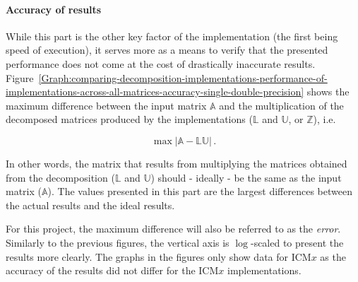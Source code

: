 \paragraph{Accuracy of results} While this part is the other key factor of the implementation (the first being speed of execution), it serves more as a means to verify that the presented performance does not come at the cost of drastically inaccurate results. Figure~\ref{Graph:comparing-decomposition-implementations-performance-of-implementations-across-all-matrices-accuracy-single-double-precision} shows the maximum difference between the input matrix $ \mathbb{A} $ and the multiplication of the decomposed matrices produced by the implementations ($ \mathbb{L} $ and $ \mathbb{U} $, or $ \mathbb{Z} $), i.e.

\begin{equation}
	\max\left| \mathbb{A} - \mathbb{L}\mathbb{U}\right| \nonumber \,.
\end{equation}

In other words, the matrix that results from multiplying the matrices obtained from the decomposition ($ \mathbb{L} $ and $ \mathbb{U} $) should - ideally - be the same as the input matrix ($ \mathbb{A} $). The values presented in this part are the largest differences between the actual results and the ideal results.
\par For this project, the maximum difference will also be referred to as the \textit{error}. Similarly to the previous figures, the vertical axis is $ \log $-scaled to present the results more clearly. The graphs in the figures only show data for ICM$ x $ as the accuracy of the results did not differ for the ICM$ x $ implementations.


